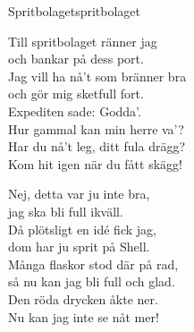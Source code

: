 \begin{song}{Spritbolaget}{spritbolaget}
\begin{vers}
Till spritbolaget ränner jag\\
och bankar på dess port.\\
Jag vill ha nå't som bränner bra\\
och gör mig sketfull fort.\\
Expediten sade: Godda'.\\
Hur gammal kan min herre va'?\\
Har du nå't leg, ditt fula drägg?\\
Kom hit igen när du fått skägg!\\
\end{vers}
\begin{vers}
Nej, detta var ju inte bra,\\
jag ska bli full ikväll.\\
Då plötsligt en idé fick jag,\\
dom har ju sprit på Shell.\\
Många flaskor stod där på rad,\\
så nu kan jag bli full och glad.\\
Den röda drycken åkte ner.\\
Nu kan jag inte se nåt mer!\\
\end{vers}
\end{song}
